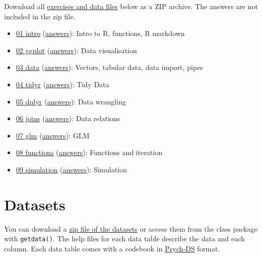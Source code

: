 \documentclass[
  oneside]{book}
\providecommand{\tightlist}{%
  \setlength{\itemsep}{0pt}\setlength{\parskip}{0pt}}
\begin{document}
Download all \href{exercises/exercises.zip}{exercises and data files} below as a ZIP archive. The answers are not included in the zip file.

\begin{itemize}
\tightlist
\item
  \href{exercises/01_intro_exercise.Rmd}{01 intro} (\href{exercises/01_intro_answers.html}{answers}): Intro to R, functions, R markdown
\item
  \href{exercises/02_ggplot_exercise.Rmd}{02 ggplot} (\href{exercises/02_ggplot_answers.html}{answers}): Data visualisation
\item
  \href{exercises/03_data_exercise.Rmd}{03 data} (\href{exercises/03_data_answers.html}{answers}): Vectors, tabular data, data import, pipes
\item
  \href{exercises/04_tidyr_exercise.Rmd}{04 tidyr} (\href{exercises/04_tidyr_answers.html}{answers}): Tidy Data
\item
  \href{exercises/05_dplyr_exercise.Rmd}{05 dplyr} (\href{exercises/05_dplyr_answers.html}{answers}): Data wrangling
\item
  \href{exercises/06_joins_exercise.Rmd}{06 joins} (\href{exercises/06_joins_answers.html}{answers}): Data relations
\item
  \href{exercises/07_glm_exercise.Rmd}{07 glm} (\href{exercises/07_glm_answers.html}{answers}): GLM
\item
  \href{exercises/08_func_exercise.Rmd}{08 functions} (\href{exercises/08_func_answers.html}{answers}): Functions and iteration
\item
  \href{exercises/09_sim_exercise.Rmd}{09 simulation} (\href{exercises/09_sim_answers.html}{answers}): Simulation
\end{itemize}

\hypertarget{datasets}{%
\chapter{Datasets}\label{datasets}}

You can download a \href{data/data.zip}{zip file of the datasets} or access them from the class package with \texttt{getdata()}. The help files for each data table describe the data and each column. Each data table comes with a codebook in \href{https://psych-ds.github.io/}{Psych-DS} format.
\end{document}

